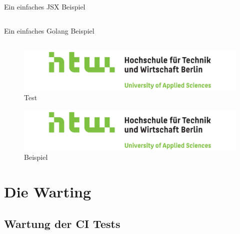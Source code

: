 \begin{listing}
    \label{lst:HelloJSX}
    \caption{Ein einfaches JSX Beispiel}
    \inputminted{jsx}{snippets/examples/Welcome.jsx}
\end{listing}

\begin{listing}
    \label{lst:Golang}
    \caption{Ein einfaches Golang Beispiel}
    \inputminted{go}{snippets/examples/hello.go}
\end{listing}

\newpage

\begin{figure}
    \label{figure:test}
    \includegraphics[scale=0.2]{img/HTW}
    \caption{Test}
\end{figure}

\begin{figure}
    \label{figure:beispiel}
    \includegraphics[scale=0.2]{img/HTW}
    \caption{Beispiel}
\end{figure}

\chapter{Die Warting}
\section{Wartung der CI Tests}
